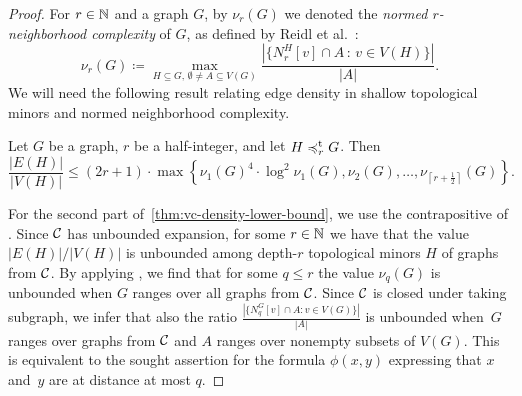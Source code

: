 \begin{proof}
For $r\in \mathbb{N}$ and a graph $G$, by $\nu_r(G)$ we denoted the
\emph{normed $r$-neighborhood complexity} of $G$, as defined
by Reidl et al.~\cite{reidl2016characterising}: 
\begin{equation*}
\nu_r(G)\coloneqq\max_{H\subseteq G,\,\emptyset\neq A\subseteq V(G)}\frac{|\{N_r^H[v]\cap A\, \colon\, v\in V(H)\}|}{|A|}.
\end{equation*}
We will need the following result relating edge density in shallow topological minors and normed neighborhood complexity.

\begin{lemma}\label{lem:lower-be}
Let $G$ be a graph, $r$ be a half-integer, 
and let $H\preccurlyeq_r^{\mathrm{t}}G$. 
Then 
$$\frac{|E(H)|}{|V(H)|}\leq (2r + 1)\cdot \max \left\{\nu_1(G)^4\cdot \log^2\nu_1(G),\nu_2(G),\ldots, \nu_{\left\lceil r+\frac{1}{2}\right\rceil}(G)\right\}.$$
\end{lemma}

For the second part of~\cref{thm:vc-density-lower-bound}, we use the contrapositive of . Since $\mathcal{C}$ has unbounded expansion, for some $r\in \mathbb{N}$ 
we have that the value $|E(H)|/|V(H)|$ is unbounded among depth-$r$ topological minors $H$ of graphs from $\mathcal{C}$.
By applying , we find that for some $q\leq r$ the value
$\nu_{q}(G)$ is unbounded when $G$ ranges over all graphs from $\mathcal{C}$. 
Since $\mathcal{C}$ is closed under taking subgraph, we infer that also the ratio 
$\frac{|\{N_q^G[v]\cap A \colon v\in V(G)\}|}{|A|}$ is unbounded when~$G$ ranges over graphs from $\mathcal{C}$ and $A$ ranges over nonempty subsets of $V(G)$.
This is equivalent to the sought assertion for the formula $\phi(x,y)$ expressing that $x$ and~$y$ are at distance at most $q$. 

\mbox{}
\end{proof}

